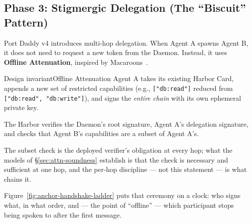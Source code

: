 \documentclass[11pt,a4paper]{article}
\theoremstyle{definition}
\begin{document}
\subsection{Phase 3: Stigmergic Delegation (The ``Biscuit'' Pattern)}

Port Daddy v4 introduces multi-hop delegation. When Agent A spawns Agent B, it does not need to request a new token from the Daemon. Instead, it uses \textbf{Offline Attenuation}, inspired by Macaroons~.

%
\begin{pdclaim}{Design invariant}{Offline Attenuation}
\setlength{\parskip}{4pt plus 1pt}
\label{def:offline-attn}
Agent A takes its existing Harbor Card, appends a new set of restricted capabilities (e.g., \texttt{["db:read"]} reduced from \texttt{["db:read", "db:write"]}), and signs the \textit{entire chain} with its own ephemeral private key.

The Harbor verifies the Daemon's root signature, Agent A's delegation signature, and checks that Agent B's capabilities are a subset of Agent A's.

The subset check is the deployed verifier's obligation at every hop; what the models of \S\ref{sec:attn-soundness} establish is that the check is necessary and sufficient at one hop, and the per-hop discipline --- not this statement --- is what chains it.
\end{pdclaim}

Figure~\ref{fig:anchor-handshake-ladder} puts that ceremony on a clock: who signs what, in what order, and --- the point of ``offline'' --- which participant stops being spoken to after the first message.
\end{document}
